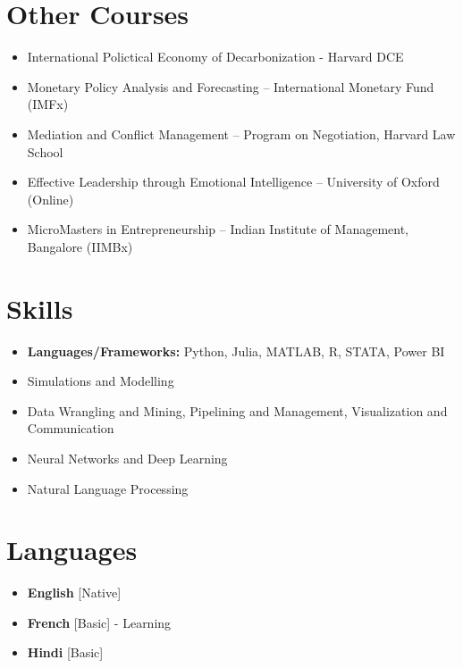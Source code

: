 \documentclass[11pt,a4paper,sans]{moderncv}
\begin{document}
\section{Other Courses}
{\begin{itemize}[label=\textbullet]
    \item International Polictical Economy of Decarbonization - Harvard DCE
    \item Monetary Policy Analysis and Forecasting – International Monetary Fund (IMFx)
    \item Mediation and Conflict Management – Program on Negotiation, Harvard Law School
    \item Effective Leadership through Emotional Intelligence – University of Oxford (Online)
    \item MicroMasters in Entrepreneurship – Indian Institute of Management, Bangalore (IIMBx)

  \end{itemize}}

\section{Skills}
{\begin{itemize}[label=\textbullet]
\item {\textbf{Languages/Frameworks:} Python, Julia, MATLAB, R, STATA, Power BI}
\item Simulations and Modelling
\item Data Wrangling and Mining, Pipelining and Management, Visualization and Communication
\item Neural Networks and Deep Learning
\item Natural Language Processing
\end{itemize}}

\section{Languages}
\begin{multicols}{2}
    \begin{itemize}[label=\textbullet]
    \item \textbf{English} [Native]
    \item {\textbf{French} [Basic] - Learning}
    \item {\textbf{Hindi} [Basic]}
    \end{itemize}
\end{multicols}
\end{document}
